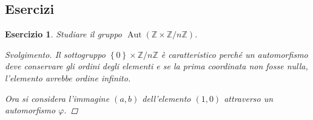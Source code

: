 \documentclass[12pt]{scrartcl}
\theoremstyle{style}
\newtheorem{esercizio}{Esercizio}[section]
\newenvironment{svolgimento}{\renewcommand\qedsymbol{$\blacksquare$}\begin{proof}[Svolgimento]}{\end{proof}}
\numberwithin{equation}{subsection}
\begin{document}
\subsection{Esercizi}
\begin{esercizio}
Studiare il gruppo $\operatorname{Aut} ( \mathbb{Z}\times \mathbb{Z}/n\mathbb{Z})$.
\begin{svolgimento}
	Il sottogruppo $\left\{ 0 \right\} \times \mathbb{Z}/n\mathbb{Z}$ \`e caratteristico perch\'e un automorfismo deve conservare gli ordini degli elementi e se la prima coordinata non fosse nulla, l'elemento avrebbe ordine infinito.

	Ora si considera l'immagine $(a,b)$ dell'elemento $(1,0)$ attraverso un automorfismo $\varphi $.
\end{svolgimento}
\end{esercizio}
\end{document}
